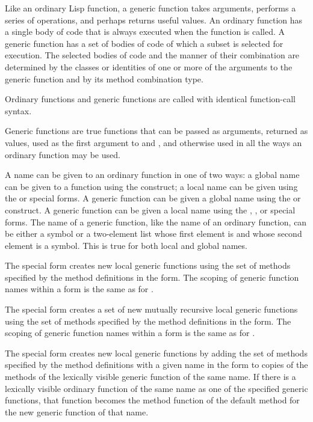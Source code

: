 Like an ordinary Lisp function, a generic function takes arguments,
performs a series of operations, and perhaps returns useful values.
An ordinary function has a single body of code that is always executed
when the function is called.  A generic function has a set of bodies
of code of which a subset is selected for execution. The selected
bodies of code and the manner of their combination are determined by
the classes or identities of one or more of the arguments to the
generic function and by its method combination type.

Ordinary functions and generic functions are called with identical function-call
syntax.
 
Generic functions are true functions that can be passed as arguments, returned as values,
used as the first argument to  and , and otherwise used in all the ways
an ordinary function may be used.

A name can be given to an ordinary function in one of
two ways: a {\bit global\/} name can be given to a function using the
 construct; a {\bit local\/} name can be given using the
 or  special forms.  A generic function can be
given a global name using the  or 
construct.  A generic function can be given a local name using the
, , or 
special forms.  The name of a generic function, like the name of an
ordinary function, can be either a symbol or a two-element list whose
first element is  and whose second element is a symbol.
This is true for both local and global names.

The  special form creates new local generic
functions using the set of methods specified by the method definitions
in the  form.  The scoping of generic function names
within a  form is the same as for .

The  special form creates a set of new mutually
recursive local generic functions using the set of methods specified
by the method definitions in the  form.  The
scoping of generic function names within a  form
is the same as for .

The  special form creates new local generic
functions by adding the set of methods specified by the method
definitions with a given name in the  form to
copies of the methods of the lexically visible generic function of the
same name. If there is a lexically visible ordinary function of the
same name as one of the specified generic functions, that function
becomes the method function of the default method for the new generic
function of that name.

